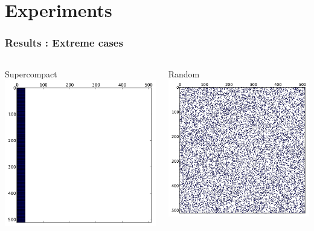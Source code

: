 \documentclass{beamer}
\begin{document}
\section{Experiments}

\begin{frame}
  \frametitle{Results : Extreme cases}
  \begin{columns}
    
    \begin{block}{Supercompact}
      \centering
      \includegraphics[width=.6\linewidth]{slides-figures/ICS-figures/supercompact_matrix-crop.png}
    \end{block}
  
    \begin{block}{Random}
      \centering
      \includegraphics[width=.6\linewidth]{slides-figures/ICS-figures/random_matrix-crop.png}
    \end{block}
    

\end{columns}
\end{frame}
\end{document}

